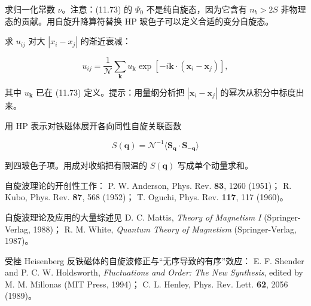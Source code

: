 \begin{exercises}
求归一化常数 $\nu$。注意：(11.73) 的 $\Psi_{0}$ 不是纯自旋态，因为它含有 $n_{b} > 2S$ 非物理态的贡献。用自旋升降算符替换 HP 玻色子可以定义合适的变分自旋态。

\item 求 $u_{ij}$ 对大 $|x_{i}-x_{j}|$ 的渐近衰减：

\begin{equation*}
u _ {ij} = \frac {1}{\mathcal {N}} \sum_ {\mathbf {k}} u _ {\mathbf {k}} \exp \left[ - i \mathbf {k} \cdot ( \mathbf {x} _ {i} - \mathbf {x} _ {j} ) \right] ,
\tag{11.74}
\end{equation*}

其中 $u_{\mathbf{k}}$ 已在 (11.73) 定义。提示：用量纲分析把 $|\mathbf{x}_i - \mathbf{x}_j|$ 的幂次从积分中标度出来。

\item 用 HP 表示对铁磁体展开各向同性自旋关联函数

\begin{equation*}
S ( \mathbf {q} ) = \mathcal {N} ^ {- 1} \langle \mathbf {S}_{\mathbf {q}} \cdot \mathbf {S} _ {- \mathbf {q}} \rangle
\tag{11.75}
\end{equation*}

到四玻色子项。用成对收缩把有限温的 $S(\mathbf{q})$ 写成单个动量求和。

\end{exercises}

\begin{chapbib}
\item 自旋波理论的开创性工作：
  P. W. Anderson, Phys. Rev. \textbf{83}, 1260 (1951)；
  R. Kubo, Phys. Rev. \textbf{87}, 568 (1952)；
  T. Oguchi, Phys. Rev. \textbf{117}, 117 (1960)。
\item 自旋波理论及应用的大量综述见
  D. C. Mattis, \textit{Theory of Magnetism I} (Springer-Verlag, 1988)；
  R. M. White, \textit{Quantum Theory of Magnetism} (Springer-Verlag, 1987)。
\item 受挫 Heisenberg 反铁磁体的自旋波修正与“无序导致的有序”效应：
  E. F. Shender and P. C. W. Holdsworth, \textit{Fluctuations and Order: The New Synthesis}, edited by M. M. Millonas (MIT Press, 1994)；
  C. L. Henley, Phys. Rev. Lett. \textbf{62}, 2056 (1989)。
\end{chapbib}
